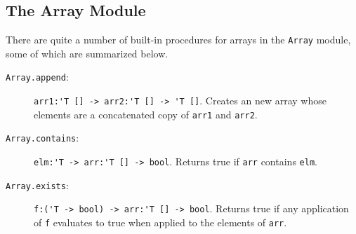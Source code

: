\documentclass[fsharpnotes.tex]{subfiles}
\begin{document}
\subsection{The Array Module}
There are quite a number of built-in procedures for arrays in the \lstinline{Array} module, some of which are summarized below.
\begin{description}
\item[\texttt{Array.append}:] \lstinline{arr1:'T [] -> arr2:'T [] -> 'T []}. Creates an new array whose elements are a concatenated copy of \lstinline{arr1} and \lstinline{arr2}.
\item[\texttt{Array.contains}:] \lstinline{elm:'T -> arr:'T [] -> bool}. Returns true if \lstinline{arr} contains \lstinline{elm}.
\item[\texttt{Array.exists}:] \lstinline{f:('T -> bool) -> arr:'T [] -> bool}. Returns true if any application of \lstinline{f} evaluates to true when applied to the elements of \lstinline{arr}.

\end{description}
\end{document}
